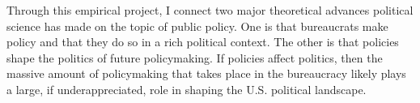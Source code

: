 Through this empirical project, I connect two major theoretical advances political science has made on the topic of public policy. One is that bureaucrats make policy and that they do so in a rich political context. The other is that policies shape the politics of future policymaking. If policies affect politics, then the massive amount of policymaking that takes place in the bureaucracy likely plays a large, if underappreciated, role in shaping the U.S. political landscape.%





























































































